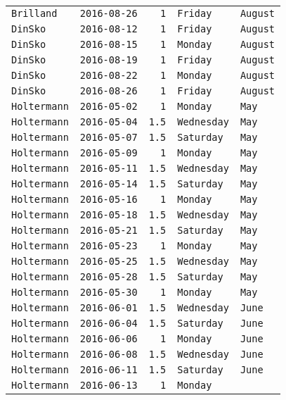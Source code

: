 \documentclass[11pt,A4paper,]{article}
\begin{document}
\begin{longtable}[]{@{}lrrll@{}}
\texttt{Brilland} & \texttt{2016-08-26} & \texttt{1} & \texttt{Friday} &
\texttt{August}\tabularnewline
\texttt{DinSko} & \texttt{2016-08-12} & \texttt{1} & \texttt{Friday} &
\texttt{August}\tabularnewline
\texttt{DinSko} & \texttt{2016-08-15} & \texttt{1} & \texttt{Monday} &
\texttt{August}\tabularnewline
\texttt{DinSko} & \texttt{2016-08-19} & \texttt{1} & \texttt{Friday} &
\texttt{August}\tabularnewline
\texttt{DinSko} & \texttt{2016-08-22} & \texttt{1} & \texttt{Monday} &
\texttt{August}\tabularnewline
\texttt{DinSko} & \texttt{2016-08-26} & \texttt{1} & \texttt{Friday} &
\texttt{August}\tabularnewline
\texttt{Holtermann} & \texttt{2016-05-02} & \texttt{1} & \texttt{Monday}
& \texttt{May}\tabularnewline
\texttt{Holtermann} & \texttt{2016-05-04} & \texttt{1.5} &
\texttt{Wednesday} & \texttt{May}\tabularnewline
\texttt{Holtermann} & \texttt{2016-05-07} & \texttt{1.5} &
\texttt{Saturday} & \texttt{May}\tabularnewline
\texttt{Holtermann} & \texttt{2016-05-09} & \texttt{1} & \texttt{Monday}
& \texttt{May}\tabularnewline
\texttt{Holtermann} & \texttt{2016-05-11} & \texttt{1.5} &
\texttt{Wednesday} & \texttt{May}\tabularnewline
\texttt{Holtermann} & \texttt{2016-05-14} & \texttt{1.5} &
\texttt{Saturday} & \texttt{May}\tabularnewline
\texttt{Holtermann} & \texttt{2016-05-16} & \texttt{1} & \texttt{Monday}
& \texttt{May}\tabularnewline
\texttt{Holtermann} & \texttt{2016-05-18} & \texttt{1.5} &
\texttt{Wednesday} & \texttt{May}\tabularnewline
\texttt{Holtermann} & \texttt{2016-05-21} & \texttt{1.5} &
\texttt{Saturday} & \texttt{May}\tabularnewline
\texttt{Holtermann} & \texttt{2016-05-23} & \texttt{1} & \texttt{Monday}
& \texttt{May}\tabularnewline
\texttt{Holtermann} & \texttt{2016-05-25} & \texttt{1.5} &
\texttt{Wednesday} & \texttt{May}\tabularnewline
\texttt{Holtermann} & \texttt{2016-05-28} & \texttt{1.5} &
\texttt{Saturday} & \texttt{May}\tabularnewline
\texttt{Holtermann} & \texttt{2016-05-30} & \texttt{1} & \texttt{Monday}
& \texttt{May}\tabularnewline
\texttt{Holtermann} & \texttt{2016-06-01} & \texttt{1.5} &
\texttt{Wednesday} & \texttt{June}\tabularnewline
\texttt{Holtermann} & \texttt{2016-06-04} & \texttt{1.5} &
\texttt{Saturday} & \texttt{June}\tabularnewline
\texttt{Holtermann} & \texttt{2016-06-06} & \texttt{1} & \texttt{Monday}
& \texttt{June}\tabularnewline
\texttt{Holtermann} & \texttt{2016-06-08} & \texttt{1.5} &
\texttt{Wednesday} & \texttt{June}\tabularnewline
\texttt{Holtermann} & \texttt{2016-06-11} & \texttt{1.5} &
\texttt{Saturday} & \texttt{June}\tabularnewline
\texttt{Holtermann} & \texttt{2016-06-13} & \texttt{1} & \texttt{Monday}

\end{longtable}
\end{document}
